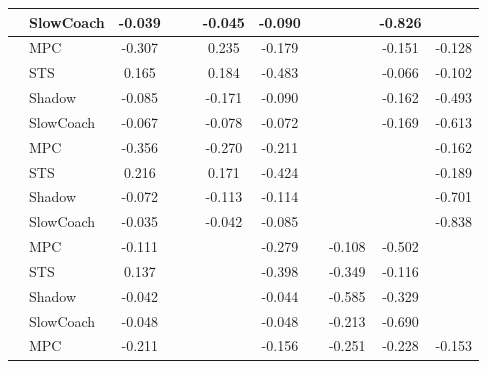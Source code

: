 \begin{tabular}{|l|l|*{9}{c|}}
                                                           & SlowCoach &   -0.039 &        &        & -0.045 & -0.090 &     &      &  -0.826 &       \\
\midrule
[True, False, False, True, True, False, False, True, True] & MPC &   -0.307 &        &        &  0.235 & -0.179 &     &      &  -0.151 &   -0.128 \\
                                                           & STS &    0.165 &        &        &  0.184 & -0.483 &     &      &  -0.066 &   -0.102 \\
                                                           & Shadow &   -0.085 &        &        & -0.171 & -0.090 &     &      &  -0.162 &   -0.493 \\
                                                           & SlowCoach &   -0.067 &        &        & -0.078 & -0.072 &     &      &  -0.169 &   -0.613 \\
\midrule
[True, False, False, True, True, False, False, False, True] & MPC &   -0.356 &        &        & -0.270 & -0.211 &     &      &      &   -0.162 \\
                                                           & STS &    0.216 &        &        &  0.171 & -0.424 &     &      &      &   -0.189 \\
                                                           & Shadow &   -0.072 &        &        & -0.113 & -0.114 &     &      &      &   -0.701 \\
                                                           & SlowCoach &   -0.035 &        &        & -0.042 & -0.085 &     &      &      &   -0.838 \\
\midrule
[True, False, False, False, True, False, True, True, False] & MPC &   -0.111 &        &        &     & -0.279 &     &  -0.108 &  -0.502 &       \\
                                                           & STS &    0.137 &        &        &     & -0.398 &     &  -0.349 &  -0.116 &       \\
                                                           & Shadow &   -0.042 &        &        &     & -0.044 &     &  -0.585 &  -0.329 &       \\
                                                           & SlowCoach &   -0.048 &        &        &     & -0.048 &     &  -0.213 &  -0.690 &       \\
\midrule
[True, False, False, False, True, False, True, True, True] & MPC &   -0.211 &        &        &     & -0.156 &     &  -0.251 &  -0.228 &   -0.153 \\

\end{tabular}
